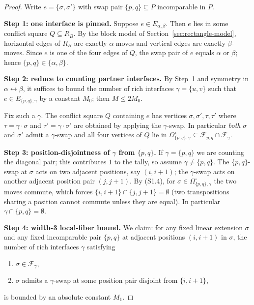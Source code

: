 \begin{proof}
Write $e=\{\sigma,\sigma'\}$ with swap pair $\{p,q\}\subseteq P$
incomparable in $P$.

\smallskip\noindent\textbf{Step 1: one interface is pinned.}
Suppose $e\in E_{\alpha,\beta}$. Then $e$ lies in some conflict square
$Q\subseteq R_B$. By the block model of
Section~\ref{sec:rectangle-model}, horizontal edges of $R_B$ are exactly
$\alpha$-moves and vertical edges are exactly $\beta$-moves. Since $e$
is one of the four edges of $Q$, the swap pair of $e$ equals $\alpha$ or
$\beta$; hence $\{p,q\}\in\{\alpha,\beta\}$.

\smallskip\noindent\textbf{Step 2: reduce to counting partner interfaces.}
By Step~1 and symmetry in $\alpha\leftrightarrow\beta$, it suffices to
bound the number of rich interfaces $\gamma=\{u,v\}$ such that
$e\in E_{\{p,q\},\gamma}$ by a constant $M_0$; then $M\le2M_0$.

Fix such a $\gamma$. The conflict square $Q$ containing $e$ has vertices
$\sigma,\sigma',\tau,\tau'$ where $\tau=\gamma\cdot\sigma$ and
$\tau'=\gamma\cdot\sigma'$ are obtained by applying the $\gamma$-swap.
In particular \emph{both} $\sigma$ and $\sigma'$ admit a $\gamma$-swap
and all four vertices of $Q$ lie in
$\Omega^\circ_{\{p,q\},\gamma}\subseteq\mathcal F_{p,q}\cap\mathcal F_\gamma$.

\smallskip\noindent\textbf{Step 3: position-disjointness of $\gamma$ from
$\{p,q\}$.}
If $\gamma=\{p,q\}$ we are counting the diagonal pair; this contributes
$1$ to the tally, so assume $\gamma\ne\{p,q\}$. The $\{p,q\}$-swap at
$\sigma$ acts on two adjacent positions, say $(i,i+1)$; the
$\gamma$-swap acts on another adjacent position pair $(j,j+1)$. By
(S1.4), for $\sigma\in\Omega^\circ_{\{p,q\},\gamma}$ the two moves
commute, which forces $\{i,i+1\}\cap\{j,j+1\}=\emptyset$ (two
transpositions sharing a position cannot commute unless they are equal).
In particular $\gamma\cap\{p,q\}=\emptyset$.

\smallskip\noindent\textbf{Step 4: width-3 local-fiber bound.}
We claim: for any fixed linear extension $\sigma$ and any fixed
incomparable pair $\{p,q\}$ at adjacent positions $(i,i+1)$ in $\sigma$,
the number of rich interfaces $\gamma$ satisfying
\begin{enumerate}[label=\textup{(\roman*)}]
\item $\sigma\in\mathcal F_\gamma$,
\item $\sigma$ admits a $\gamma$-swap at some position pair disjoint from
$\{i,i+1\}$,
\end{enumerate}
is bounded by an absolute constant $M_1$.


\end{proof}
